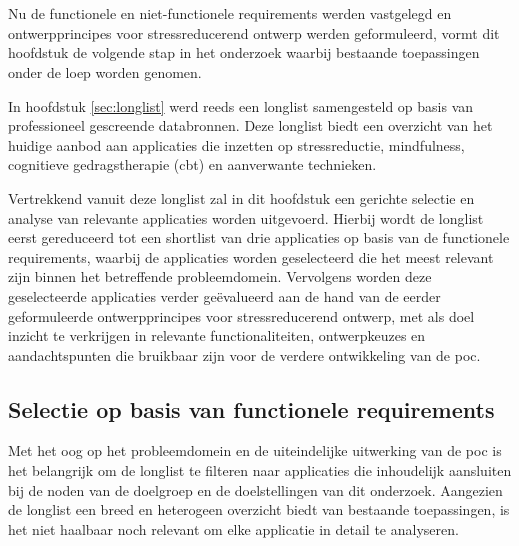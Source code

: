 
\chapter{}%
\label{ch:shortlist}

Nu de functionele en niet-functionele requirements werden vastgelegd en ontwerpprincipes voor stressreducerend ontwerp werden geformuleerd, vormt dit hoofdstuk de volgende stap in het onderzoek waarbij bestaande toepassingen onder de loep worden genomen.

\vspace{1em}

In hoofdstuk \ref{sec:longlist} werd reeds een longlist samengesteld op basis van professioneel gescreende databronnen. Deze longlist biedt een overzicht van het huidige aanbod aan applicaties die inzetten op stressreductie, mindfulness, cognitieve gedragstherapie (\acrshort{cbt}) en aanverwante technieken.

\vspace{1em}

Vertrekkend vanuit deze longlist zal in dit hoofdstuk een gerichte selectie en analyse van relevante applicaties worden uitgevoerd. Hierbij wordt de longlist eerst gereduceerd tot een shortlist van drie applicaties op basis van de functionele requirements, waarbij de applicaties worden geselecteerd die het meest relevant zijn binnen het betreffende probleemdomein. Vervolgens worden deze geselecteerde applicaties verder geëvalueerd aan de hand van de eerder geformuleerde ontwerpprincipes voor stressreducerend ontwerp, met als doel inzicht te verkrijgen in relevante functionaliteiten, ontwerpkeuzes en aandachtspunten die bruikbaar zijn voor de verdere ontwikkeling van de \acrlong{poc}.

\newpage



\section{Selectie op basis van functionele requirements}
\label{sec:longlist-reductie}

\vspace{1em}

Met het oog op het probleemdomein en de uiteindelijke uitwerking van de \acrshort{poc} is het belangrijk om de longlist te filteren naar applicaties die inhoudelijk aansluiten bij de noden van de doelgroep en de doelstellingen van dit onderzoek. Aangezien de longlist een breed en heterogeen overzicht biedt van bestaande toepassingen, is het niet haalbaar noch relevant om elke applicatie in detail te analyseren.

